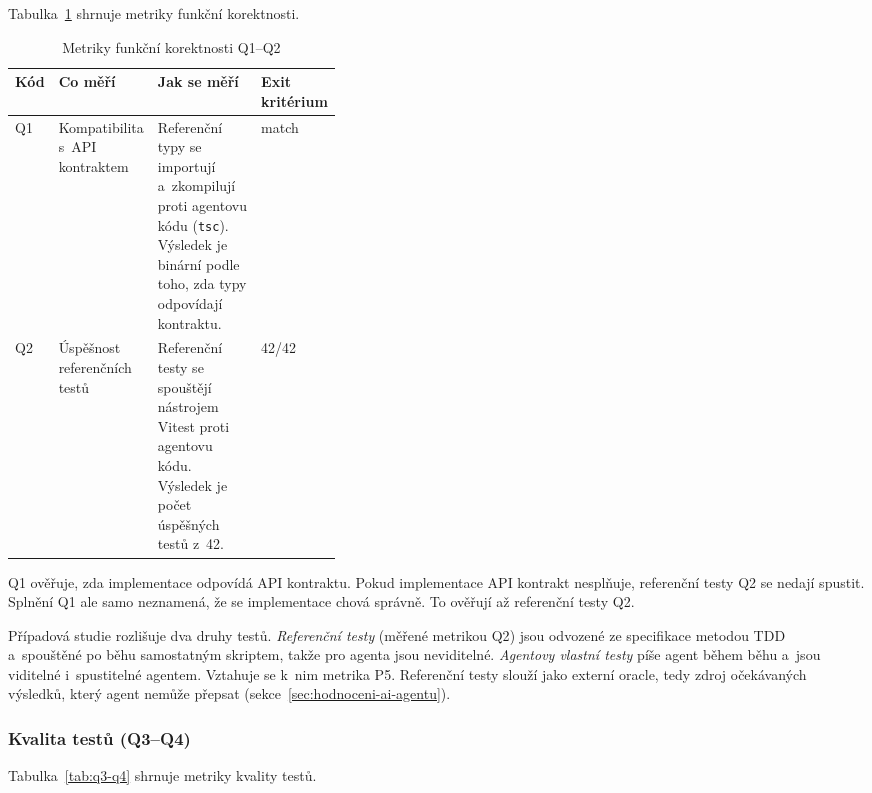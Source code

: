 Tabulka~\ref{tab:q1-q2} shrnuje metriky funkční korektnosti.

\begin{table}[htbp]
\centering
\caption{Metriky funkční korektnosti Q1--Q2}
\label{tab:q1-q2}
\footnotesize
\setlength{\tabcolsep}{4pt}
\begin{tabularx}{\linewidth}{@{}lp{0.22\linewidth}Xp{0.16\linewidth}@{}}
\toprule
\textbf{Kód} & \textbf{Co měří} & \textbf{Jak se měří} & \textbf{Exit kritérium} \\
\midrule
\acs{Q1} & Kompatibilita s~API kontraktem &
Referenční typy se importují a~zkompilují proti agentovu kódu
(\texttt{tsc}). Výsledek je binární podle toho, zda typy odpovídají
kontraktu. & match \\
\addlinespace
\acs{Q2} & Úspěšnost referenčních testů &
Referenční testy se spouštějí nástrojem Vitest proti agentovu kódu.
Výsledek je počet úspěšných testů z~42. & 42/42 \\
\bottomrule
\end{tabularx}
\end{table}
\FloatBarrier

\acs{Q1} ověřuje, zda implementace odpovídá API kontraktu. Pokud
implementace API kontrakt nesplňuje, referenční testy \acs{Q2} se
nedají spustit. Splnění \acs{Q1} ale samo neznamená, že se implementace
chová správně. To ověřují až referenční testy \acs{Q2}.

\label{sec:referencni-testy}%
Případová studie rozlišuje dva druhy testů. \textit{Referenční testy}
(měřené metrikou \acs{Q2}) jsou odvozené ze specifikace metodou
TDD~\cite{mathews2024} a~spouštěné po běhu samostatným skriptem,
takže pro agenta jsou neviditelné. \textit{Agentovy vlastní testy}
píše agent během běhu a~jsou viditelné i~spustitelné agentem. Vztahuje
se k~nim metrika \acs{P5}. Referenční testy slouží jako externí
oracle, tedy zdroj očekávaných výsledků, který agent nemůže přepsat
(sekce~\ref{sec:hodnoceni-ai-agentu}).

\subsubsection*{Kvalita testů (Q3--Q4)}

Tabulka~\ref{tab:q3-q4} shrnuje metriky kvality testů.

